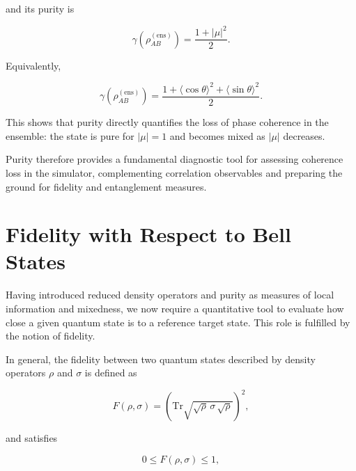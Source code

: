 and its purity is

\begin{equation}
\gamma
\left(
\rho_{AB}^{(\mathrm{ens})}
\right)
=
\frac{1+|\mu|^2}{2}.
\label{eq:random_phase_ensemble_purity_mu}
\end{equation}

Equivalently,

\begin{equation}
\gamma
\left(
\rho_{AB}^{(\mathrm{ens})}
\right)
=
\frac{
1
+
\langle \cos\theta \rangle^2
+
\langle \sin\theta \rangle^2
}{2}.
\label{eq:random_phase_ensemble_purity_trigonometric}
\end{equation}

This shows that purity directly quantifies the loss of phase coherence in the ensemble: the state is pure for \( |\mu|=1 \) and becomes mixed as \( |\mu| \) decreases.

\medskip

Purity therefore provides a fundamental diagnostic tool for assessing coherence loss in the simulator, complementing correlation observables and preparing the ground for fidelity and entanglement measures.


\section{Fidelity with Respect to Bell States}

Having introduced reduced density operators and purity as measures of local information and mixedness, we now require a quantitative tool to evaluate how close a given quantum state is to a reference target state. This role is fulfilled by the notion of fidelity.

\medskip

In general, the fidelity between two quantum states described by density operators \( \rho \) and \( \sigma \) is defined as

\begin{equation}
F(\rho,\sigma)
=
\left(
\mathrm{Tr}
\sqrt{
\sqrt{\rho}\,
\sigma\,
\sqrt{\rho}
}
\right)^2,
\label{eq:fidelity_general_definition}
\end{equation}

and satisfies

\[
0
\le
F(\rho,\sigma)
\le
1,
\]


